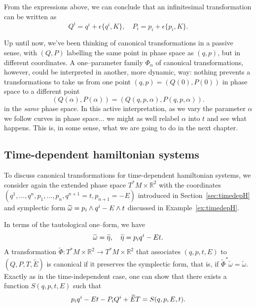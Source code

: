 \documentclass[english,fontsize=11pt,paper=a5,oneside]{scrbook}
\newcommand{\R}{\mathbb{R}}
\let\d\relax
\DeclareMathOperator{\d}{d}
\theoremstyle{definition}
\begin{document}
From the expressions above, we can conclude that an infinitesimal transformation can be written as
\begin{equation}\label{eq:forminfct}
    Q^i = q^i + \epsilon \big\{q^i, K\big\}, \quad
    P_i = p_i + \epsilon \big\{p_i, K\big\}.
\end{equation}

Up until now, we've been thinking of canonical transformations in a passive sense, with $(Q,P)$ labelling the same point in phase space as $(q, p)$, but in different coordinates.
A one--parameter family $\Phi_\alpha$ of canonical transformations, however, could be interpreted in another, more dynamic, way: nothing prevents a transformations to take us from one point $(q,p)=(Q(0), P(0))$ in phase space to a different point
\begin{equation}
    (Q(\alpha),P(\alpha)) = (Q(q,p,\alpha), P(q,p,\alpha)).    
\end{equation}
in the \emph{same} phase space.
In this active interpretation, as we vary the parameter $\alpha$ we follow curves in phase space... we might as well relabel $\alpha$ into $t$ and see what happens.
This is, in some sense, what we are going to do in the next chapter.

\subsection{Time-dependent hamiltonian systems}

To discuss canonical transformations for time-dependent hamiltonian systems, we consider again the extended phase space $T^*M\times \R^2$ with the coordinates $(q^1,\ldots,q^n,p_1,\ldots,p_n, q^{n+1}=t, p_{n+1}=-E)$ introduced in Section~\ref{sec:timedepH} and symplectic form  $\widetilde\omega = \d p_i\wedge \d q^i - \d E\wedge \d t$ discussed in Example~\ref{ex:timedepH}.

In terms of the tautological one--form, we have
\begin{equation}
    \widetilde\omega = \d \widetilde\eta, \quad \widetilde\eta = p_i \d q^i - E \d t.
\end{equation}
A transformation $\widetilde\Phi : T^*M\times \R^2 \to T^*M\times \R^2$ that associates $(q,p,t,E)$ to $(Q,P,T,\widetilde E)$ is canonical if it preserves the symplectic form, that is, if ${\widetilde\Phi}^* \widetilde \omega = \widetilde \omega$. Exactly as in the time-independent case, one can show that there exists a function $S(q,p,t,E)$ such that
\begin{equation}\label{eq:timedepgen}
    p_i \d q^i -E \d t - P_i \d Q^i + \widetilde E \d T = \d S(q,p,E,t).
\end{equation}
\end{document}
